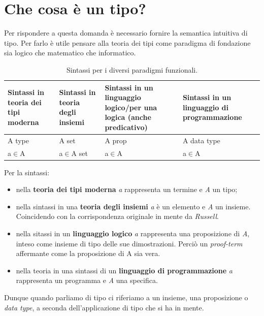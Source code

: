 \documentclass[10pt,a4paper, italian]{book}
\begin{document}
\section{Che cosa \`e un tipo?}
\label{sec:cosa e un tipo}
Per rispondere a questa domanda \`e necessario fornire la semantica intuitiva di tipo. Per farlo \`e utile pensare alla teoria dei tipi come paradigma di fondazione sia logico che matematico che informatico.

\begin{table}[h]
\centering
\begin{tabularx}{\textwidth}{XXXX}
\hline 
\rowcolor{orange}
{\color[HTML]{FFFFFF}\textbf{Sintassi in teoria dei tipi moderna}} & {\color[HTML]{FFFFFF}\textbf{Sintassi in teoria degli insiemi}} & {\color[HTML]{FFFFFF} \textbf{Sintassi in un linguaggio logico/per una logica (anche predicativo)}} & {\color[HTML]{FFFFFF}\textbf{Sintassi in un linguaggio di programmazione}} \\
\hline\hline 
A type & A set & A prop & A data type \\ 
\hline 
a$\in$A & a$\in$A set & a$\in$A & a$\in$A \\ 
\hline 
\end{tabularx}
\caption{\label{tab:sintassi-paradigmi-funzionali}Sintassi per i diversi paradigmi funzionali.} 
\end{table}
\noindent
Per la sintassi:
\begin{itemize} 
\item nella \textbf{teoria dei tipi moderna} \textit{a} rappresenta un termine e \textit{A} un tipo;
\item nella sintassi in una \textbf{teoria degli insiemi} \textit{a} \`e un elemento e \textit{A} un insieme. Coincidendo con la corrispondenza originale in mente da \textit{Russell}.
\item nella sitassi in un \textbf{linguaggio logico} \textit{a} rappresenta una proposizione di \textit{A}, inteso come insieme di tipo delle sue dimostrazioni. Perci\`o un \textit{proof-term} affermante come la proposizione di A sia vera.
\item nella teoria in una sintassi di un \textbf{linguaggio di programmazione} \textit{a} rappresenta un programma e \textit{A} una specifica.
\end{itemize}
\noindent
Dunque quando parliamo di tipo ci riferiamo a un insieme, una proposizione o \textit{data type}, a seconda dell'applicazione di tipo che si ha in mente.\\\\
\end{document}
